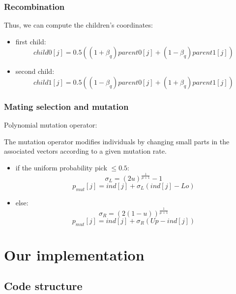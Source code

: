 \documentclass{beamer}
\begin{document}
\begin{frame}
\frametitle{Recombination}
Thus, we can compute the children's coordinates:

\begin{itemize}
\item first child:
\begin{equation}
child0[j] = 0.5((1+\beta_q)parent0[j]+(1-\beta_q)parent1[j])
\end{equation}
\item second child:
\begin{equation}
child1[j] = 0.5((1-\beta_q)parent0[j]+(1+\beta_q)parent1[j])
\end{equation}
\end{itemize}

\end{frame}

\begin{frame}
\frametitle{Mating selection and mutation}
Polynomial mutation operator:

The mutation operator modifies individuals by changing small parts in the associated vectors according to a given mutation rate.

\begin{itemize}
\item if the uniform probability pick $\leq 0.5$:
\begin{equation}
\sigma_L = (2u)^{\frac{1}{\mu +1}}-1 
\end{equation}
\begin{equation}
p_{mut}[j] = ind[j] + \sigma_L(ind[j]-Lo)
\end{equation}
\item else:
\begin{equation}
\sigma_R = (2(1-u))^{\frac{1}{\mu +1}} 
\end{equation}
\begin{equation}
p_{mut}[j] = ind[j] + \sigma_R(Up-ind[j])
\end{equation}
\end{itemize}

\end{frame}

\section{Our implementation}
\subsection{Code structure}
\begin{frame}

\end{frame}
\end{document}
